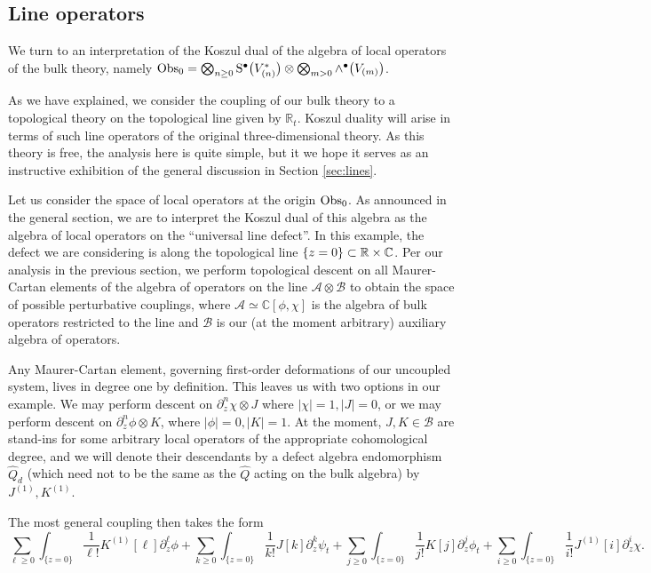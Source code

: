 \documentclass[11pt]{amsart}
\begin{document}
\subsection*{Line operators}

We turn to an interpretation of the Koszul dual of the algebra of local operators of the bulk theory, namely ${\rm Obs}_0 = \bigotimes_{n \geq 0} {\rm S}^\bullet \big(V^*_{(n)}\big) \otimes \bigotimes_{m > 0} \wedge^\bullet \big(V_{(m)}\big)$. 

As we have explained, we consider the coupling of our bulk theory to a topological theory on the topological line given by $\mathbb{R}_t$. Koszul duality will arise in terms of such line operators of the original three-dimensional theory. 
As this theory is free, the analysis here is quite simple, but it we hope it serves as an instructive exhibition of the general discussion in Section \ref{sec:lines}. 

Let us consider the space of local operators at the origin ${\rm Obs}_0$. 
As announced in the general section, we are to interpret the Koszul dual of this algebra as the algebra of local operators on the ``universal line defect''.
In this example, the defect we are considering is along the topological line $\{z=0\} \subset \mathbb R \times \mathbb C$. 
Per our analysis in the previous section, we perform topological descent on all Maurer-Cartan elements of the algebra of operators on the line $\mathcal{A}\otimes \mathcal{B}$ to obtain the space of possible perturbative couplings, where $\mathcal{A} \simeq \mathbb{C}[\phi, \chi]$ is the algebra of bulk operators restricted to the line and $\mathcal{B}$ is our (at the moment arbitrary) auxiliary algebra of operators. 

Any Maurer-Cartan element, governing first-order deformations of our uncoupled system, lives in degree one by definition. This leaves us with two options in our example. We may perform descent on $\partial_z^n \chi \otimes J$ where $|\chi| = 1, |J|=0$, or we may perform descent on $\partial_z^n \phi \otimes K$, where $|\phi|=0, |K| = 1$.  At the moment, $J, K \in \mathcal{B}$ are stand-ins for some arbitrary local operators of the appropriate cohomological degree, and we will denote their descendants by a defect algebra endomorphism $\hat{Q}_{d}$ (which need not to be the same as the $\hat{Q}$ acting on the bulk algebra) by $J^{(1)}, K^{(1)}$. 


The most general coupling then takes the form
\[
\sum_{\ell \geq 0} \int_{\{z=0\}} \frac{1}{\ell!} K^{(1)} [\ell] \partial_z^\ell \phi + \sum_{k \geq 0} \int_{\{z=0\}} \frac{1}{k!} J[k] \partial_z^k \psi_t  + \sum_{j \geq 0} \int_{\{z=0\}} \frac{1}{j!} K[j] \partial_z^j \phi_t +  \sum_{i \geq 0} \int_{\{z=0\}} \frac{1}{i!} J^{(1)}[i] \partial_z^i \chi.
\] 
\end{document}
